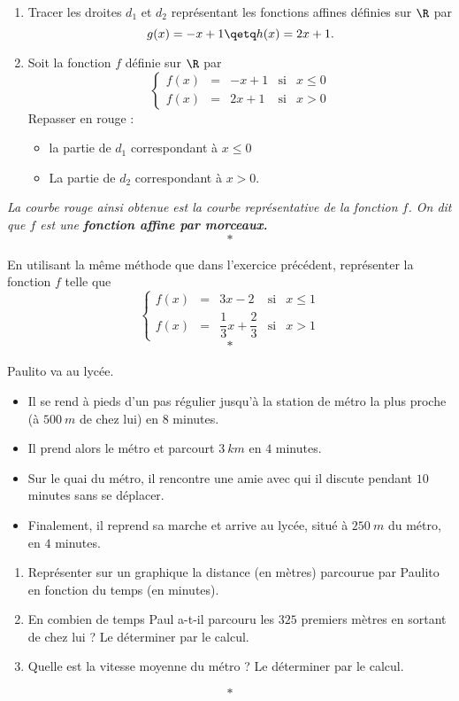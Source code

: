\documentclass[12pt,french]{book}
\begin{document}

\exo

\begin{enumerate}
    \item Tracer les droites $d_1$ et $d_2$ représentant les fonctions affines définies sur $\R$ par \[g(x) = -x + 1 \qetq h(x) = 2x + 1.\]
    \item Soit la fonction $f$ définie sur $\R$ par
    \[\left\{\begin{array}{rclcl}
    f(x) & = & -x + 1 & \text{si} & x \leqslant 0\\
    f(x) & = & 2x + 1 & \text{si} & x > 0
    \end{array}\right.\]
    Repasser en rouge :
        \begin{itemize}
            \item la partie de $d_1$ correspondant à $x \leq 0$
            \item La partie de $d_2$ correspondant à $x > 0$.
        \end{itemize}
\end{enumerate}

{\itshape La courbe rouge ainsi obtenue est la courbe représentative de la fonction $f$. On dit que $f$ est une \textbf{fonction affine par morceaux.}}\[*\]

\exo

En utilisant la même méthode que dans l'exercice précédent, représenter la fonction $f$ telle que
    \[\left\{\begin{array}{rclcl}
        f(x) & = & 3x - 2 & \text{si} & x \leqslant 1\\[6pt]
        f(x) & = & \dfrac13 x + \dfrac23 & \text{si} & x > 1
    \end{array}\right.\]\[*\]

\exo

Paulito va au lycée.

\begin{itemize}
    \item Il se rend à pieds d'un pas régulier jusqu'à la station de métro la plus proche (à $500~m$ de chez lui) en $8$ minutes.
    \item Il prend alors le métro et parcourt $3~km$ en $4$ minutes.
    \item Sur le quai du métro, il rencontre une amie avec qui il discute pendant $10$ minutes sans se déplacer.
    \item Finalement, il reprend sa marche et arrive au lycée, situé à $250~m$ du métro, en $4$ minutes.
\end{itemize}

\begin{enumerate}
    \item Représenter sur un graphique la distance (en mètres) parcourue par Paulito en fonction du temps (en minutes).
    \item En combien de temps Paul a-t-il parcouru les $325$ premiers mètres en sortant de chez lui ? Le déterminer par le calcul.
    \item Quelle est la vitesse moyenne du métro ? Le déterminer par le calcul.
\end{enumerate}\[*\]
\end{document}
